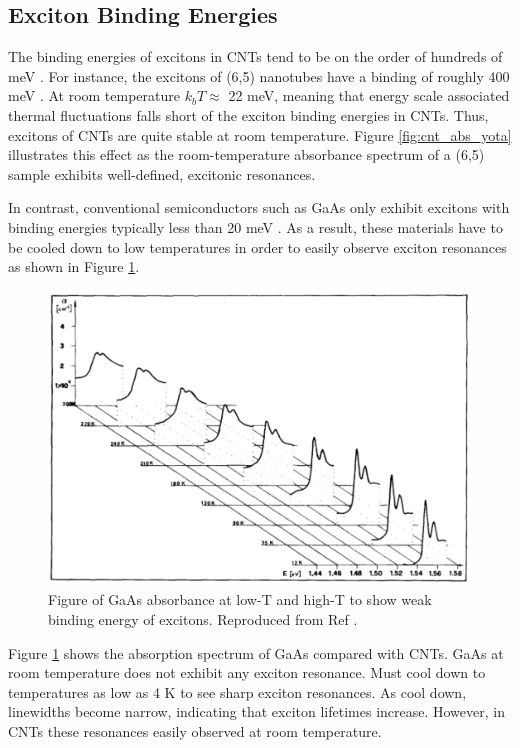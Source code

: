 \subsection{Exciton Binding Energies}

The binding energies of excitons in CNTs tend to be on the order of hundreds of meV \cite{wang2005optical}. For instance, the excitons of (6,5) nanotubes have a binding of roughly 400 meV \cite{wang2005optical}. At room temperature $k_b T \approx$ 22 meV, meaning that energy scale associated thermal fluctuations falls short of the exciton binding energies in CNTs. Thus, excitons of CNTs are quite stable at room temperature. Figure \ref{fig:cnt_abs_yota} illustrates this effect as the room-temperature absorbance spectrum of a (6,5) sample exhibits well-defined, excitonic resonances. 

In contrast, conventional semiconductors such as GaAs only exhibit excitons with binding energies typically less than 20 meV \cite{liang1970excitons}.  As a result, these materials have to be cooled down to low temperatures in order to easily observe exciton resonances as shown in Figure \ref{fig:gaas_vs_cnt_absorbance}. 

\begin{figure}[h]
	\centering
	\includegraphics[scale=0.55]{images/chapter_optical_props/gaas_absorbance_filipowicz}
	\caption{Figure of GaAs absorbance at low-T and high-T to show weak binding energy of excitons. Reproduced from Ref \cite{filipowicz1990temperature}.}
	\label{fig:gaas_vs_cnt_absorbance}
\end{figure}

Figure \ref{fig:gaas_vs_cnt_absorbance} shows the absorption spectrum of GaAs compared with CNTs. GaAs at room temperature does not exhibit any exciton resonance. Must cool down to temperatures as low as 4 K to see sharp exciton resonances. As cool down, linewidths become narrow, indicating that exciton lifetimes increase. However, in CNTs these resonances easily observed at room temperature. 


